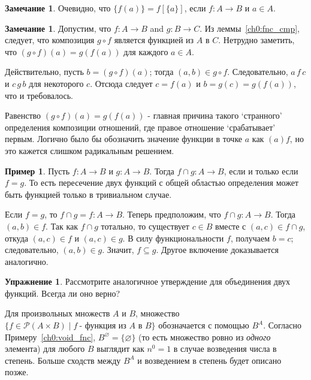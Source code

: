 \documentclass[12pt,notitlepage]{article}
\theoremstyle{plain}
\theoremstyle{definition}
\newtheorem{exc}[thm]{Упражнение}
\newtheorem{exm}[thm]{Пример}
\newtheorem{rem}[thm]{Замечание}
\theoremstyle{plain}
\newcommand{\sbs}{\subseteq}
\newcommand{\void}{\varnothing}
\newcommand{\mP}{\mathcal{P}}
\newcommand{\1}{\mathbf{1}}
\newcommand{\0}{\mathbf{0}}
\newcommand{\mcomm}[1]{}
\begin{document}
\begin{rem}
	Очевидно, что $\{f(a)\} = f[\{a\}]$, если $f\colon A \to B$ и $a \in A$.
\end{rem}

\mcomm{The students may have already defined composition of functions in their calculus course. So, it is important to show them the identity of `our' composition (when restricted to functions) with that of calculus.}
\begin{rem}
	Допустим, что $f\colon A \to B$ and $g\colon B \to C$. Из леммы~\ref{ch0:fnc_cmp}, следует, что композиция $g \circ f$ является функцией из $A$ в $C$. Нетрудно заметить, что $(g\circ f)(a) = g(f(a))$ для каждого $a \in A$.
	
	Действительно, пусть $b = (g \circ f)(a)$; тогда $(a, b) \in g \circ f$. Следовательно, $a\, f\, c$ и $c\, g\, b$ для некоторого $c$. Отсюда следует $c = f(a)$ и $b = g(c) = g (f(a))$, что и требовалось.
	
	Равенство $(g\circ f)(a) = g(f(a))$ - главная причина такого `странного' определения композиции отношений, где правое отношение `срабатывает' первым. Логично было бы обозначить значение функции в точке $a$ как $(a)f$, но это кажется слишком радикальным решением.
\end{rem}

\begin{exm}
	Пусть $f\colon A \to B$ и $g\colon A \to B$. Тогда ${f \cap g}\colon A \to B$, если и только если $f = g$. То есть пересечение двух функций с общей областью определения может быть функцией только в тривиальном случае.
	
	Если $f = g$, то $f \cap g = f \colon A \to B$. Теперь предположим, что ${f \cap g}\colon A \to B$. Тогда $(a,b) \in f$. Так как $f \cap g$ тотально, то существует $c \in B$ вместе с $(a,c) \in f \cap g$, откуда $(a,c) \in f$ и $(a,c) \in g$. В силу функциональности $f$, получаем $b = c$; следовательно, $(a,b) \in g$. Значит, $f \sbs g$. Другое включение доказывается аналогично.
\end{exm}

\begin{exc}
	Рассмотрите аналогичное утверждение для объединения двух функций. Всегда ли оно верно?
\end{exc}

Для произвольных множеств $A$ и $B$, множество $\{ f \in \mP(A \times B) \mid f\ \mbox{- функция из $A$ в $B$}\}$ обозначается с помощью $B^A$. Согласно Примеру~\ref{ch0:void_fnc}, $B^\void = \{ \void \}$ (то есть множество ровно из \emph{одного} элемента) для любого $B$ выглядит как $n^0 = 1$ в случае возведения числа в степень. Больше сходств между $B^A$ и возведением в степень будет описано позже.
\end{document}
